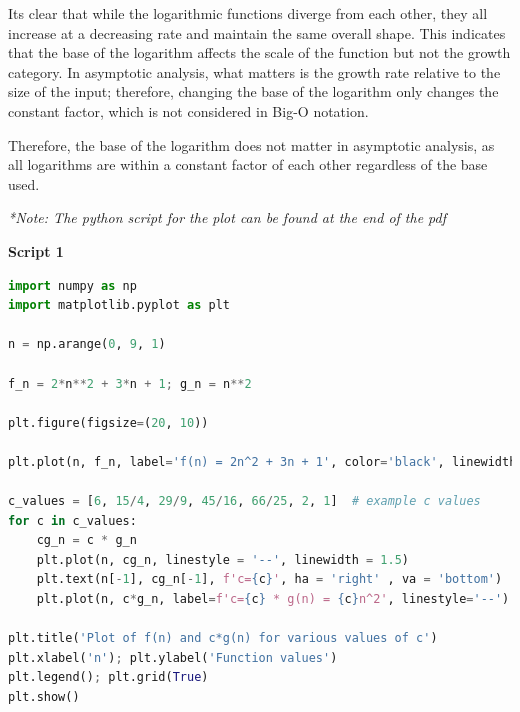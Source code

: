 \documentclass[addpoints]{exam}
\begin{document}
\begin{questions}
\begin{solution}
    Its clear that while the logarithmic functions diverge from each other, they all increase at a decreasing rate and maintain the same overall shape. This indicates that the base of the logarithm affects the scale of the function but not the growth category. In asymptotic analysis, what matters is the growth rate relative to the size of the input; therefore, changing the base of the logarithm only changes the constant factor, which is not considered in Big-O notation. 

    Therefore, the base of the logarithm does not matter in asymptotic analysis, as all logarithms are within a constant factor of each other regardless of the base used. 

    \textit{*Note: The python script for the plot can be found at the end of the pdf}
  \end{solution}
\end{questions}

\newpage
\textbf{Script 1}
\begin{lstlisting}[language=Python, caption=Python script for plotting $f(n)$ and $cg(n)$]
import numpy as np
import matplotlib.pyplot as plt

n = np.arange(0, 9, 1) 

f_n = 2*n**2 + 3*n + 1; g_n = n**2

plt.figure(figsize=(20, 10))

plt.plot(n, f_n, label='f(n) = 2n^2 + 3n + 1', color='black', linewidth = 2)

c_values = [6, 15/4, 29/9, 45/16, 66/25, 2, 1]  # example c values
for c in c_values:
    cg_n = c * g_n
    plt.plot(n, cg_n, linestyle = '--', linewidth = 1.5)
    plt.text(n[-1], cg_n[-1], f'c={c}', ha = 'right' , va = 'bottom')
    plt.plot(n, c*g_n, label=f'c={c} * g(n) = {c}n^2', linestyle='--')

plt.title('Plot of f(n) and c*g(n) for various values of c')
plt.xlabel('n'); plt.ylabel('Function values')
plt.legend(); plt.grid(True)
plt.show()
\end{lstlisting}
\end{document}
